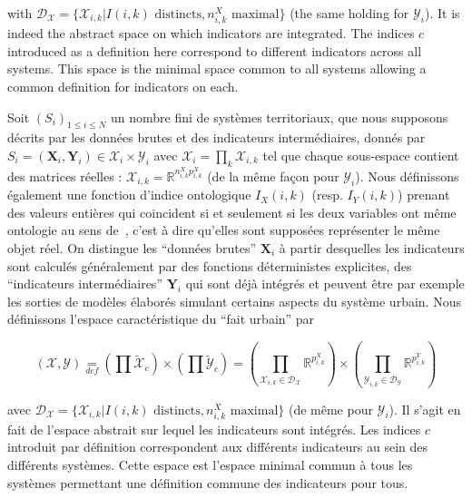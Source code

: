 {with $\mathcal{D}_{\mathcal{X}}=\{\mathcal{X}_{i,k}|I(i,k)\textrm{ distincts},n_{i,k}^{X}\mbox{ maximal}\}$
(the same holding for $\mathcal{Y}_{i}$). It is indeed the abstract space on which indicators are integrated. The indices $c$ introduced as a definition here correspond to different indicators across all systems. This space is the minimal space common to all systems allowing a common definition for indicators on each.
}{
Soit $(S_{i})_{1\leq i\leq N}$ un nombre fini de systèmes territoriaux, que nous supposons décrits par les données brutes et des indicateurs intermédiaires, donnés par $S_{i}=(\mathbf{X}_{i},\mathbf{Y}_{i})\in\mathcal{X}_{i}\times\mathcal{Y}_{i}$ avec $\mathcal{X}_{i}=\prod_{k}\mathcal{X}_{i,k}$ tel que chaque sous-espace contient des matrices réelles : $\mathcal{X}_{i,k}=\mathbb{R}^{n_{i,k}^{X}p_{i,k}^{X}}$ (de la même façon pour $\mathcal{Y}_{i}$). Nous définissons également une fonction d'indice ontologique $I_{X}(i,k)$ (resp. $I_{Y}(i,k)$) prenant des valeurs entières qui coincident si et seulement si les deux variables ont même ontologie au sens de~\cite{livet2010}, c'est à dire qu'elles sont supposées représenter le même objet réel. On distingue les ``données brutes'' $\mathbf{X}_{i}$ à partir desquelles les indicateurs sont calculés généralement par des fonctions déterministes explicites, %
 des ``indicateurs intermédiaires'' $\mathbf{Y}_{i}$ qui sont déjà intégrés et peuvent être par exemple les sorties de modèles élaborés simulant certains aspects du système urbain. Nous définissons l'espace caractéristique du ``fait urbain'' par


\begin{equation}
(\mathcal{X},\mathcal{Y}) \underset{def}{=} \left(\prod\tilde{\mathcal{X}}_{c}\right)\times\left(\prod\tilde{\mathcal{Y}}_{c}\right) = \left(\prod_{\mathcal{X}_{i,k}\in\mathcal{D}_{\mathcal{X}}}\mathbb{R}^{p_{i,k}^{X}}\right)\times\left(\prod_{\mathcal{Y}_{i,k}\in\mathcal{D}_{\mathcal{Y}}}\mathbb{R}^{p_{i,k}^{Y}}\right)
\end{equation}

avec $\mathcal{D}_{\mathcal{X}}=\{\mathcal{X}_{i,k}|I(i,k)\textrm{ distincts},n_{i,k}^{X}\mbox{ maximal}\}$
(de même pour $\mathcal{Y}_{i}$). Il s'agit en fait de l'espace abstrait sur lequel les indicateurs sont intégrés. Les indices $c$ introduit par définition correspondent aux différents indicateurs au sein des différents systèmes. Cette espace est l'espace minimal commun à tous les systèmes permettant une définition commune des indicateurs pour tous.
}



